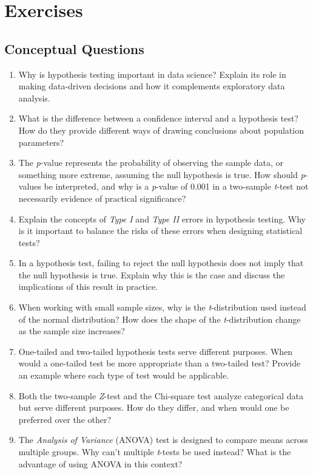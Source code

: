 \documentclass[
  11pt,
]{book}
\theoremstyle{definition}
\theoremstyle{definition}
\theoremstyle{definition}
\theoremstyle{definition}
\theoremstyle{remark}
\begin{document}
\section{Exercises}\label{exercises-3}

\subsection*{Conceptual Questions}\label{conceptual-questions-1}


\begin{enumerate}
\def\labelenumi{\arabic{enumi}.}
\item
  Why is hypothesis testing important in data science? Explain its role in making data-driven decisions and how it complements exploratory data analysis.
\item
  What is the difference between a confidence interval and a hypothesis test? How do they provide different ways of drawing conclusions about population parameters?
\item
  The \emph{p}-value represents the probability of observing the sample data, or something more extreme, assuming the null hypothesis is true. How should \emph{p}-values be interpreted, and why is a \emph{p}-value of 0.001 in a two-sample \emph{t}-test not necessarily evidence of practical significance?
\item
  Explain the concepts of \emph{Type I} and \emph{Type II} errors in hypothesis testing. Why is it important to balance the risks of these errors when designing statistical tests?
\item
  In a hypothesis test, failing to reject the null hypothesis does not imply that the null hypothesis is true. Explain why this is the case and discuss the implications of this result in practice.
\item
  When working with small sample sizes, why is the \emph{t}-distribution used instead of the normal distribution? How does the shape of the \emph{t}-distribution change as the sample size increases?
\item
  One-tailed and two-tailed hypothesis tests serve different purposes. When would a one-tailed test be more appropriate than a two-tailed test? Provide an example where each type of test would be applicable.
\item
  Both the two-sample \emph{Z}-test and the Chi-square test analyze categorical data but serve different purposes. How do they differ, and when would one be preferred over the other?
\item
  The \emph{Analysis of Variance} (ANOVA) test is designed to compare means across multiple groups. Why can't multiple \emph{t}-tests be used instead? What is the advantage of using ANOVA in this context?
\end{enumerate}
\end{document}
